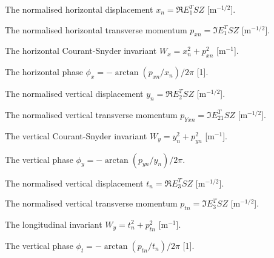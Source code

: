 \begin{mylist}
The normalised horizontal displacement
\(x_{n}=\Re E_1^T S Z\) [\(\mathrm{m}^{-1/2}\)].

The normalised horizontal transverse momentum
\(p_{xn}=\Im E_1^T S Z\) [\(\mathrm{m}^{-1/2}\)].

The horizontal Courant-Snyder invariant
\(W_{x}=x_{n}^{2}+p_{xn}^{2}\) [\(\mathrm{m}^{-1}\)].

The horizontal phase
\(\phi_{x}=-\arctan(p_{xn}/x_{n}) / 2\pi\) [1].

The normalised vertical displacement
\(y_{n}=\Re E_2^T S Z\) [\(\mathrm{m}^{-1/2}\)].

The normalised vertical transverse momentum
\(p_{Yxn}=\Im E_21^T S Z\) [\(\mathrm{m}^{-1/2}\)].

The vertical Courant-Snyder invariant
\(W_{y}=y_{n}^{2}+p_{yn}^{2}\) [\(\mathrm{m}^{-1}\)].

The vertical phase
\(\phi_{y}=-\arctan(p_{yn}/y_{n}) / 2\pi\).

The normalised vertical displacement
\(t_{n}=\Re E_3^T S Z\) [\(\mathrm{m}^{-1/2}\)].

The normalised vertical transverse momentum
\(p_{tn}=\Im E_3^T S Z\) [\(\mathrm{m}^{-1/2}\)].

The longitudinal invariant
\(W_{y}=t_n^2 + p_{tn}^2\) [\(\mathrm{m}^{-1}\)].

The vertical phase
\(\phi_{t}=-\arctan(p_{tn}/t_{n}) / 2\pi\) [1].
\end{mylist}

